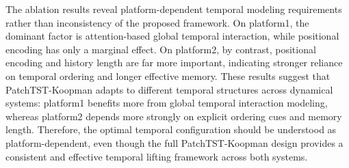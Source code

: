 The ablation results reveal platform-dependent temporal modeling requirements rather than inconsistency of the proposed framework. On platform1, the dominant factor is attention-based global temporal interaction, while positional encoding has only a marginal effect. On platform2, by contrast, positional encoding and history length are far more important, indicating stronger reliance on temporal ordering and longer effective memory. These results suggest that PatchTST-Koopman adapts to different temporal structures across dynamical systems: platform1 benefits more from global temporal interaction modeling, whereas platform2 depends more strongly on explicit ordering cues and memory length. Therefore, the optimal temporal configuration should be understood as platform-dependent, even though the full PatchTST-Koopman design provides a consistent and effective temporal lifting framework across both systems.
